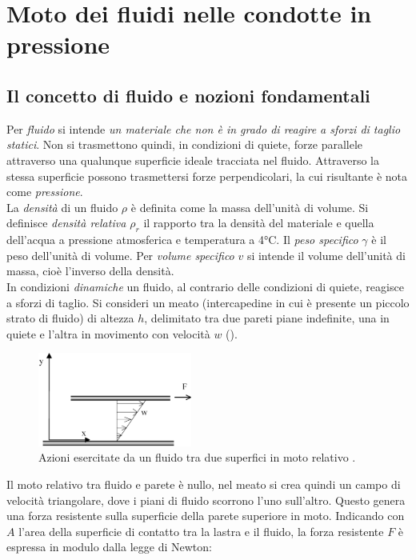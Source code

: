 \clearpage{\pagestyle{empty}\cleardoublepage}
\chapter{Moto dei fluidi nelle condotte in pressione}\label{ch:fluidodinamica}
\section{Il concetto di fluido e nozioni fondamentali}
Per \textit{fluido} si intende \textit{un materiale che non è in grado di reagire a sforzi di taglio statici}. Non si trasmettono quindi, in condizioni di quiete, forze parallele attraverso una qualunque superficie ideale tracciata nel fluido. Attraverso la stessa superficie possono trasmettersi forze perpendicolari, la cui risultante è nota come \textit{pressione}.\\
La \textit{densità} di un fluido \(\rho\) è definita come la massa dell'unità di volume. Si definisce \textit{densità relativa \(\rho_r\)} il rapporto tra la densità del materiale e quella dell'acqua a pressione atmosferica e temperatura a 4°C. Il \textit{peso specifico} \(\gamma\) è il peso dell'unità di volume. Per \textit{volume specifico} \(v\) si intende il volume dell'unità di massa, cioè l'inverso della densità. \\
In condizioni \textit{dinamiche} un fluido, al contrario delle condizioni di quiete, reagisce a sforzi di taglio. Si consideri un meato (intercapedine in cui è presente un piccolo strato di fluido) di altezza \(h\), delimitato tra due pareti piane indefinite, una in quiete e l'altra in movimento con velocità \(w\) ().
\begin{figure}[!htbp] %
    \centering
    \includegraphics[width=0.45\textwidth]{fig/fluidodinamica/meato.eps}
    \caption{Azioni esercitate da un fluido tra due superfici in moto relativo \parencite{guglielmini2004lezioni}.} 
    \label{fig:meato}
\end{figure}
Il moto relativo tra fluido e parete è nullo, nel meato si crea quindi un campo di velocità triangolare, dove i piani di fluido scorrono l'uno sull'altro. Questo genera una forza resistente sulla superficie della parete superiore in moto. Indicando con \(A\) l'area della superficie di contatto tra  la lastra e il fluido, la forza resistente \(F\) è espressa in modulo dalla legge di Newton:
